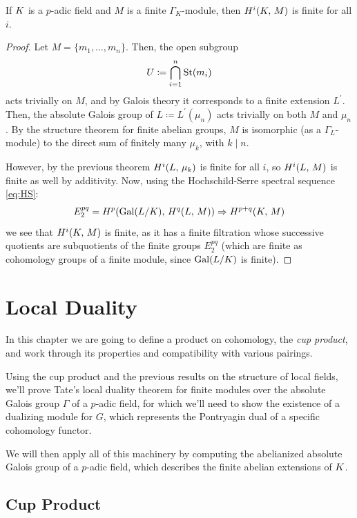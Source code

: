 \documentclass[a4paper, oneside]{memoir}
\begin{document}

\begin{corollary}\label{cor:FinCohom}
    If $K$ is a $p$-adic field and $M$ is a finite $\Gamma_K$-module, then
    \(H^{i}( K, \, M )\) is finite for all $i$.
\end{corollary}
\begin{proof}
    Let $M=\{m_1,\ldots,m_n\}$. Then, the open subgroup
    \[
        U\coloneqq \bigcap_{i=1}^n{\operatorname{\mathrm{St}}(m_i)}
    \]
    acts trivially on $M$, and by Galois theory it corresponds to a finite extension $L^{\prime} $. Then, the absolute Galois group of $L\coloneqq L^{\prime}(\mu_n)$ acts trivially on both $M$ and $\mu_n$. By the structure theorem for finite abelian groups, $M$ is isomorphic (as a $\Gamma_L$-module) to the direct sum of finitely many $\mu_k$, with $k\mid n$.

    However, by the previous theorem $H^{i}( L, \, \mu_k )$ is finite for all $i$, so $H^{i}( L, \, M )$ is finite as well by additivity. Now, using the Hochschild-Serre spectral sequence \eqref{eq:HS}:
    \[
        E_2^{pq}= H^{p}( \mathrm{Gal}{(L / K)}, \, H^{q}( L, \, M ) ) \Rightarrow H^{p+q}( K, \, M )
    \]
    we see that $H^{i}( K, \, M )$ is finite, as it has a finite filtration whose successive quotients are subquotients of the finite groups $E_2^{pq}$ (which are finite as cohomology groups of a finite module, since $\mathrm{Gal}(L /K)$ is finite).
\end{proof}

\chapter{Local Duality}
In this chapter we are going to define a product on cohomology, the \textit{cup product}, and work through its properties and compatibility with various pairings.

Using the cup product and the previous results on the structure of local fields, we'll prove Tate's local duality theorem for finite modules over the absolute Galois group $\Gamma$ of a $p$-adic field, for which we'll need to show the existence of a dualizing module for $G$, which represents the Pontryagin dual of a specific cohomology functor.

We will then apply all of this machinery by computing the abelianized absolute Galois group of a $p$-adic field, which describes the finite abelian extensions of $K$.

\section{Cup Product}
\end{document}
